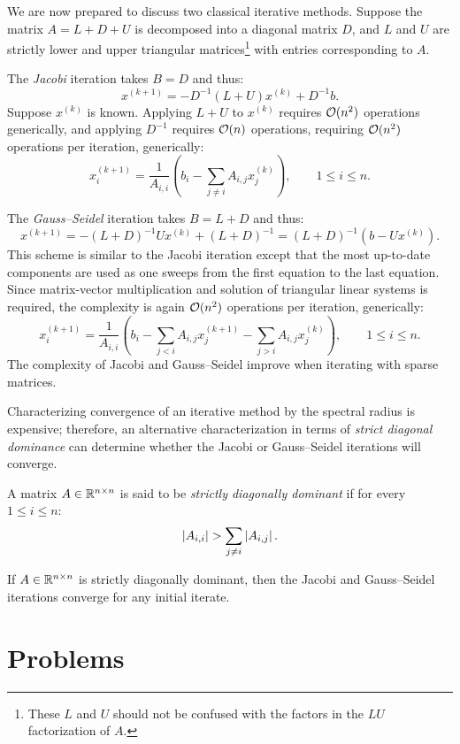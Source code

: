 We are now prepared to discuss two classical iterative methods. Suppose the matrix $A = L+D+U$ is decomposed into a diagonal matrix $D$, and $L$ and $U$ are strictly lower and upper triangular matrices\footnote{These $L$ and $U$ should not be confused with the factors in the $LU$ factorization of $A$.} with entries corresponding to $A$.

The {\em Jacobi} iteration takes $B=D$ and thus:
\[
x^{(k+1)} = -D^{-1}(L+U)x^{(k)} + D^{-1}b.
\]
Suppose $x^{(k)}$ is known. Applying $L+U$ to $x^{(k)}$ requires $\mathcal{O}(n^2)$ operations generically, and applying $D^{-1}$ requires $\mathcal{O}(n)$ operations, requiring $\mathcal{O}(n^2)$ operations per iteration, generically:
\[
x_i^{(k+1)} = \dfrac{1}{A_{i,i}}\left(b_i-\sum_{j\ne i}A_{i,j}x_j^{(k)}\right),\qquad 1\le i\le n.
\]

The {\em Gauss--Seidel} iteration takes $B=L+D$ and thus:
\[
x^{(k+1)} = -(L+D)^{-1}Ux^{(k)} + (L+D)^{-1} = (L+D)^{-1}(b-Ux^{(k)}).
\]
This scheme is similar to the Jacobi iteration except that the most up-to-date components are used as one sweeps from the first equation to the last equation. Since matrix-vector multiplication and solution of triangular linear systems is required, the complexity is again $\mathcal{O}(n^2)$ operations per iteration, generically:
\[
x_i^{(k+1)} = \dfrac{1}{A_{i,i}}\left(b_i-\sum_{j< i}A_{i,j}x_j^{(k+1)} - \sum_{j>i}A_{i,j}x_j^{(k)}\right),\qquad 1\le i\le n.
\]
The complexity of Jacobi and Gauss--Seidel improve when iterating with sparse matrices.

Characterizing convergence of an iterative method by the spectral radius is expensive; therefore, an alternative characterization in terms of {\em strict diagonal dominance} can determine whether the Jacobi or Gauss--Seidel iterations will converge.

\begin{definition}
A matrix $A\in\mathbb{R}^{n\times n}$ is said to be {\em strictly diagonally dominant} if for every $1\le i\le n$:
\[
\left|{A_{i,i}}\right| > \sum_{j\ne i} \left|{A_{i,j}}\right|.
\]
\end{definition}

\begin{theorem}\label{theorem:DiagonalDominance}
If $A\in\mathbb{R}^{n\times n}$ is strictly diagonally dominant, then the Jacobi and Gauss--Seidel iterations converge for any initial iterate.
\end{theorem}

\section{Problems}

